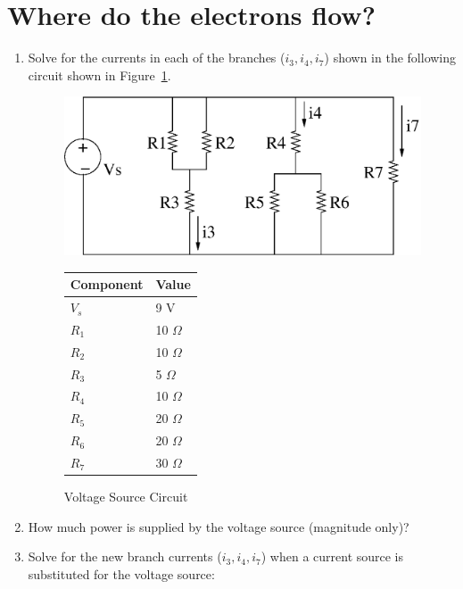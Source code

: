 \section{Where do the electrons flow?}
\begin{enumerate}
    \item Solve for the currents in each of the branches ($i_3, i_4, i_7$)
        shown in the following circuit shown in Figure~\ref{fig:p1vs}.

    \begin{figure}[h!]
    \begin{minipage}[l]{0.75\linewidth}
    \centering
    \includegraphics[width=0.75\linewidth]{p1/p1vs.eps}
    \caption{Voltage Source Circuit}
    \label{fig:p1vs}
    \end{minipage}\hfill
    \begin{minipage}[l]{0.25\linewidth}
    \vspace*{-0.25in}
    \begin{tabular}{|l|l|}
    \hline
    Component & Value \\ \hline
    $V_s$ & 9 V \\ \hline
    $R_1$ & 10 $\Omega$ \\ \hline
    $R_2$ & 10 $\Omega$ \\ \hline
    $R_3$ & 5 $\Omega$ \\ \hline
    $R_4$ & 10 $\Omega$ \\ \hline
    $R_5$ & 20 $\Omega$ \\ \hline
    $R_6$ & 20 $\Omega$ \\ \hline
    $R_7$ & 30 $\Omega$ \\ \hline
    \end{tabular}
    \end{minipage}
    \end{figure}

    \item How much power is supplied by the voltage source (magnitude only)?

    \item Solve for the new branch currents ($i_3, i_4, i_7$) when a current
        source is substituted for the voltage source:


\end{enumerate}
